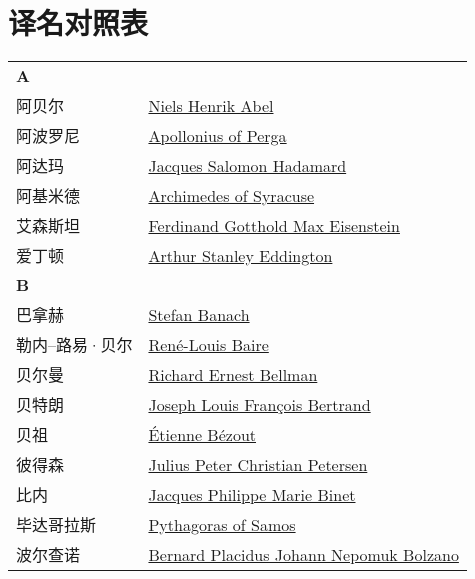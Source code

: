 \chapter{译名对照表}
\def\InsertTable#1{\begin{longtable}{ll} #1 \end{longtable}}%
\InsertTable{
	\textbf{A} \\
	阿贝尔 & \href{https://mathshistory.st-andrews.ac.uk/Biographies/Abel/}{Niels Henrik Abel} \\
	阿波罗尼 & \href{https://mathshistory.st-andrews.ac.uk/Biographies/Apollonius/}{Apollonius of Perga} \\
	阿达玛 & \href{https://mathshistory.st-andrews.ac.uk/Biographies/Hadamard/}{Jacques Salomon Hadamard} \\
	阿基米德 & \href{https://mathshistory.st-andrews.ac.uk/Biographies/Archimedes/}{Archimedes of Syracuse} \\
	艾森斯坦 & \href{https://mathshistory.st-andrews.ac.uk/Biographies/Eisenstein/}{Ferdinand Gotthold Max Eisenstein} \\
	爱丁顿 & \href{https://mathshistory.st-andrews.ac.uk/Biographies/Eddington/}{Arthur Stanley Eddington} \\
	\textbf{B} \\
	巴拿赫 & \href{https://mathshistory.st-andrews.ac.uk/Biographies/Banach/}{Stefan Banach} \\
	勒内--路易·贝尔 & \href{https://mathshistory.st-andrews.ac.uk/Biographies/Baire/}{Ren\'e-Louis Baire} \\
	贝尔曼 & \href{https://mathshistory.st-andrews.ac.uk/Biographies/Bellman/}{Richard Ernest Bellman} \\
	贝特朗 & \href{https://mathshistory.st-andrews.ac.uk/Biographies/Bertrand/}{Joseph Louis Fran\c{c}ois Bertrand} \\
	贝祖 & \href{https://mathshistory.st-andrews.ac.uk/Biographies/Bezout/}{\'Etienne B\'ezout} \\
	彼得森 & \href{https://mathshistory.st-andrews.ac.uk/Biographies/Petersen/}{Julius Peter Christian Petersen} \\
	比内 & \href{https://mathshistory.st-andrews.ac.uk/Biographies/Binet/}{Jacques Philippe Marie Binet} \\
	毕达哥拉斯 & \href{https://mathshistory.st-andrews.ac.uk/Biographies/Pythagoras/}{Pythagoras of Samos} \\
	波尔查诺 & \href{https://mathshistory.st-andrews.ac.uk/Biographies/Bolzano/}{Bernard Placidus Johann Nepomuk Bolzano} \\
}
